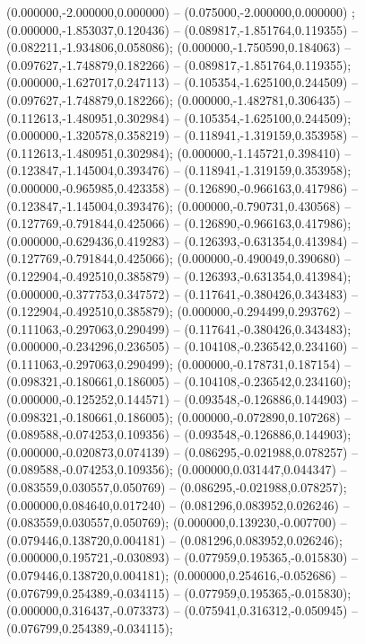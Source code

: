  (0.000000,-2.000000,0.000000) -- (0.075000,-2.000000,0.000000) ;
 (0.000000,-1.853037,0.120436) -- (0.089817,-1.851764,0.119355) -- (0.082211,-1.934806,0.058086);
 (0.000000,-1.750590,0.184063) -- (0.097627,-1.748879,0.182266) -- (0.089817,-1.851764,0.119355);
 (0.000000,-1.627017,0.247113) -- (0.105354,-1.625100,0.244509) -- (0.097627,-1.748879,0.182266);
 (0.000000,-1.482781,0.306435) -- (0.112613,-1.480951,0.302984) -- (0.105354,-1.625100,0.244509);
 (0.000000,-1.320578,0.358219) -- (0.118941,-1.319159,0.353958) -- (0.112613,-1.480951,0.302984);
 (0.000000,-1.145721,0.398410) -- (0.123847,-1.145004,0.393476) -- (0.118941,-1.319159,0.353958);
 (0.000000,-0.965985,0.423358) -- (0.126890,-0.966163,0.417986) -- (0.123847,-1.145004,0.393476);
 (0.000000,-0.790731,0.430568) -- (0.127769,-0.791844,0.425066) -- (0.126890,-0.966163,0.417986);
 (0.000000,-0.629436,0.419283) -- (0.126393,-0.631354,0.413984) -- (0.127769,-0.791844,0.425066);
 (0.000000,-0.490049,0.390680) -- (0.122904,-0.492510,0.385879) -- (0.126393,-0.631354,0.413984);
 (0.000000,-0.377753,0.347572) -- (0.117641,-0.380426,0.343483) -- (0.122904,-0.492510,0.385879);
 (0.000000,-0.294499,0.293762) -- (0.111063,-0.297063,0.290499) -- (0.117641,-0.380426,0.343483);
 (0.000000,-0.234296,0.236505) -- (0.104108,-0.236542,0.234160) -- (0.111063,-0.297063,0.290499);
 (0.000000,-0.178731,0.187154) -- (0.098321,-0.180661,0.186005) -- (0.104108,-0.236542,0.234160);
 (0.000000,-0.125252,0.144571) -- (0.093548,-0.126886,0.144903) -- (0.098321,-0.180661,0.186005);
 (0.000000,-0.072890,0.107268) -- (0.089588,-0.074253,0.109356) -- (0.093548,-0.126886,0.144903);
 (0.000000,-0.020873,0.074139) -- (0.086295,-0.021988,0.078257) -- (0.089588,-0.074253,0.109356);
 (0.000000,0.031447,0.044347) -- (0.083559,0.030557,0.050769) -- (0.086295,-0.021988,0.078257);
 (0.000000,0.084640,0.017240) -- (0.081296,0.083952,0.026246) -- (0.083559,0.030557,0.050769);
 (0.000000,0.139230,-0.007700) -- (0.079446,0.138720,0.004181) -- (0.081296,0.083952,0.026246);
 (0.000000,0.195721,-0.030893) -- (0.077959,0.195365,-0.015830) -- (0.079446,0.138720,0.004181);
 (0.000000,0.254616,-0.052686) -- (0.076799,0.254389,-0.034115) -- (0.077959,0.195365,-0.015830);
 (0.000000,0.316437,-0.073373) -- (0.075941,0.316312,-0.050945) -- (0.076799,0.254389,-0.034115);
